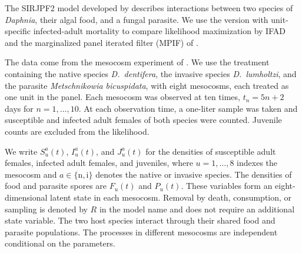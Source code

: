 \documentclass[11pt]{article}
\theoremstyle{thmstylethree}%
\begin{document}
The SIRJPF2 model developed by \citet{yang25daphnia} describes interactions between two species of \textit{Daphnia}, their algal food, and a fungal parasite.
We use the version with unit-specific infected-adult mortality to compare likelihood maximization by IFAD and the marginalized panel iterated filter (MPIF) of \citet{wheeler25}.

The data come from the mesocosm experiment of \citet{searle16}.
We use the treatment containing the native species \textit{D.~dentifera}, the invasive species \textit{D.~lumholtzi}, and the parasite \textit{Metschnikowia bicuspidata}, with eight mesocosms, each treated as one unit in the panel.
Each mesocosm was observed at ten times, $t_n=5n+2$ days for $n=1,\ldots,10$.
At each observation time, a one-liter sample was taken and susceptible and infected adult females of both species were counted.
Juvenile counts are excluded from the likelihood.

We write $S_u^a(t)$, $I_u^a(t)$, and $J_u^a(t)$ for the densities of susceptible adult females, infected adult females, and juveniles, where $u=1,\ldots,8$ indexes the mesocosm and $a\in\{\mathrm n,\mathrm i\}$ denotes the native or invasive species.
The densities of food and parasite spores are $F_u(t)$ and $P_u(t)$.
These variables form an eight-dimensional latent state in each mesocosm.
Removal by death, consumption, or sampling is denoted by $R$ in the model name and does not require an additional state variable.
The two host species interact through their shared food and parasite populations.
The processes in different mesocosms are independent conditional on the parameters.
\end{document}
